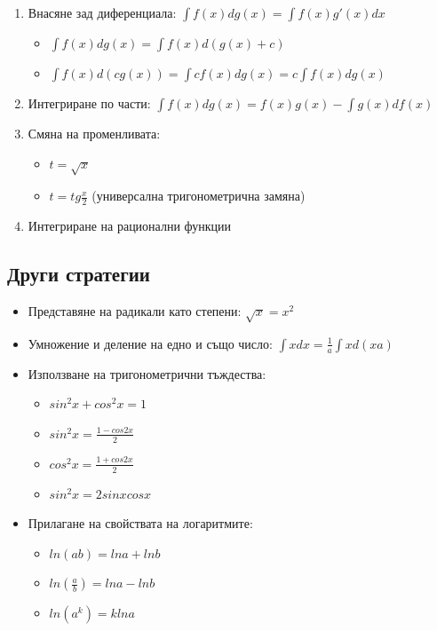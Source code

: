 \documentclass{article}
\begin{document}
\begin{enumerate}
    \item Внасяне зад диференциала: $\int f(x)dg(x) = \int f(x)g'(x)dx$
        \begin{itemize}
            \item $\int f(x)dg(x) = \int f(x)d(g(x) + c)$
            \item $\int f(x)d(cg(x)) = \int cf(x)dg(x) = c\int f(x)dg(x)$
        \end{itemize}        
    \item Интегриране по части: $\int f(x)dg(x) = f(x)g(x) - \int g(x)df(x)$
    \item Смяна на променливата:
        \begin{itemize}
            \item $t = \sqrt{x}$
            \item $t = tg\frac{x}{2}$ (универсална тригонометрична замяна)
        \end{itemize}
    \item Интегриране на рационални функции
\end{enumerate}

\subsection*{{Други стратегии}}

\begin{itemize}
    \item Представяне на радикали като степени: $\sqrt{x} = x^2$
    \item Умножение и деление на едно и също число: $\int xdx = \frac{1}{a} \int xd(xa)$
    \item Използване на тригонометрични тъждества:
        \begin{itemize}
            \item $sin^2x + cos^2x = 1$
            \item $sin^2x = \frac{1 - cos2x}{2}$
            \item $cos^2x = \frac{1 + cos2x}{2}$
            \item $sin^2x = 2sinxcosx$
        \end{itemize}
    \item Прилагане на свойствата на логаритмите:
        \begin{itemize}
            \item $ln(ab) = lna + lnb$
            \item $ln(\frac{a}{b}) = lna - lnb$
            \item $ln(a^k) = klna$
        \end{itemize}
\end{itemize}
\end{document}
